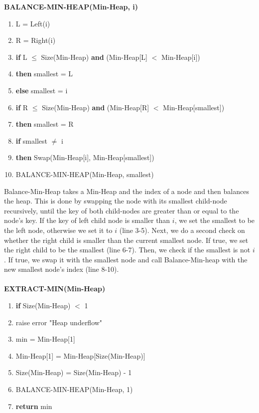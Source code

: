 \documentclass[11pt]{article}
\begin{document}
\textbf{BALANCE-MIN-HEAP(Min-Heap, i)}
\begin{enumerate}
\setlength\itemsep{0em}
\item L = Left(i)
\item R = Right(i)
\item \textbf{if } L $\leq$ Size(Min-Heap) \textbf{and} (Min-Heap[L] $<$ Min-Heap[i])
\item \tab \textbf{then } smallest = L
\item \tab \textbf{else } smallest = i
\item \textbf{if } R $\leq$ Size(Min-Heap) \textbf{and} (Min-Heap[R] $<$ Min-Heap[smallest])
\item \tab \textbf{then } smallest = R
\item \textbf{if } smallest $\neq$ i
\item \tab \textbf{then } Swap(Min-Heap[i], Min-Heap[smallest])
\item \tab \tab BALANCE-MIN-HEAP(Min-Heap, smallest)
\end{enumerate}

\noindent Balance-Min-Heap takes a Min-Heap and the index of a node and then balances the heap. This is done by swapping the node with its smallest child-node recursively, until the key of both child-nodes are greater than or equal to the node's key. If the key of left child node is smaller than $i$, we set the smallest to be the left node, otherwise we set it to $i$ (line 3-5). Next, we do a second check on whether the right child is smaller than the current smallest node. If true, we set the right child to be the smallest (line 6-7). Then, we check if the smallest is not $i$. If true, we swap it with the smallest node and call Balance-Min-heap with the new smallest node's index (line 8-10).\\\\


\textbf{EXTRACT-MIN(Min-Heap)}
\begin{enumerate}
\setlength\itemsep{0em}
\item \textbf{if } Size(Min-Heap) $<$ 1
\item \tab raise error "Heap underflow"
\item min = Min-Heap[1]
\item Min-Heap[1] = Min-Heap[Size(Min-Heap)]
\item Size(Min-Heap) = Size(Min-Heap) - 1
\item BALANCE-MIN-HEAP(Min-Heap, 1)
\item \textbf{return} min
\end{enumerate}
\end{document}
